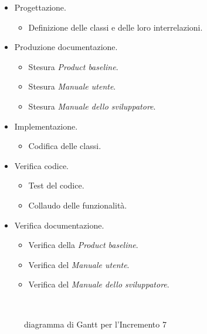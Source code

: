 \documentclass[../piano-di-progetto.tex]{subfiles}
\begin{document}
\begin{itemize}
  \item Progettazione.
  \begin{itemize}
    \item Definizione delle classi e delle loro interrelazioni.
  \end{itemize}
  \item Produzione documentazione.
  \begin{itemize}
    \item Stesura \textit{Product baseline}.
    \item Stesura \textit{Manuale utente}.
    \item Stesura \textit{Manuale dello sviluppatore}.
  \end{itemize}
  \item Implementazione.
  \begin{itemize}
    \item Codifica delle classi.
  \end{itemize}
  \item Verifica codice.
  \begin{itemize}
    \item Test del codice.
    \item Collaudo delle funzionalità.
  \end{itemize}
  \item Verifica documentazione.
  \begin{itemize}
    \item Verifica della \textit{Product baseline}.
    \item Verifica del \textit{Manuale utente}.
    \item Verifica del \textit{Manuale dello sviluppatore}.
  \end{itemize}
\end{itemize}
\begin{figure}[H]
  \centering
  
  \caption{diagramma di Gantt per l'Incremento 7}%
~~\label{fig:gantt_incremento_7}
\end{figure}
\end{document}
